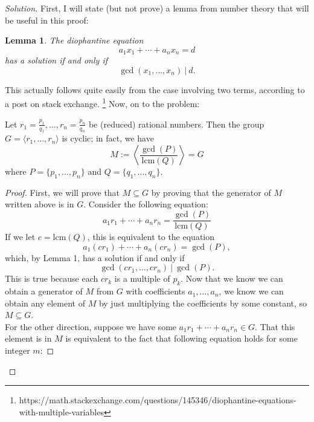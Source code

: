 \documentclass[12pt]{article}
\newenvironment{proposition}[1][Proposition]{\begin{trivlist}
\item[\hskip \labelsep {\bfseries #1.}]}{\end{trivlist}}
\newcommand{\lcm}[1]{\text{lcm}(#1)}
\newenvironment{solution}
  {\renewcommand\qedsymbol{$\blacksquare$}\begin{proof}[Solution]}
{\end{proof}}
\newenvironment{sproof}{
  \renewcommand\qedsymbol{$\square$}
  \begin{proof}
  }{
  \end{proof}
}
\newtheorem{lemma}{Lemma}
\begin{document}
\begin{solution}
  First, I will state (but not prove) a lemma from number theory
  that will be useful in this proof:
  \begin{lemma}
    The diophantine equation
    \begin{equation*}
      a_1x_1 + \cdots + a_nx_n = d
    \end{equation*}
    has a solution if and only if $$\gcd(x_1,\dots,x_n)~|~d.$$
  \end{lemma}
  This actually follows quite easily from the case involving two terms, according to a post on stack exchange.
  \footnote{https://math.stackexchange.com/questions/145346/diophantine-equations-with-multiple-variables}
  Now, on to the problem:
  \begin{proposition}
    Let $r_1=\frac{p_1}{q_1}, \dots, r_n=\frac{p_n}{q_n}$ be (reduced) rational numbers.
    Then the group $G=\langle r_1,\dots,r_n\rangle$ is cyclic; in fact, we have
    \begin{equation*}
      M := \left\langle \frac{\gcd(P)}{\lcm{Q}}\right\rangle = G
    \end{equation*}
    where $P=\{p_1,\dots,p_n\}$ and $Q=\{q_1,\dots,q_n\}$.
  \end{proposition}
  \begin{sproof}
    First, we will prove that $M \subseteq G$ by proving that the generator of $M$ written above is in $G$.
    Consider the following equation:
    \begin{equation*}
      a_1r_1 + \cdots + a_nr_n = \frac{\gcd(P)}{\lcm{Q}}
    \end{equation*}
    If we let $c=\lcm{Q}$, this is equivalent to the equation
    \begin{equation*}
      a_1(cr_1) + \cdots + a_n(cr_n) = \gcd(P),
    \end{equation*}
    which, by Lemma 1, has a solution if and only if 
    \begin{equation*}
      \gcd(cr_1, \dots, cr_n)~|~\gcd(P).
    \end{equation*}
    This is true because each $cr_k$ is a multiple of $p_k$.
    Now that we know we can obtain a generator of $M$ from $G$ with coefficients $a_1,\dots,a_n$,
    we know we can obtain any element of $M$ by just multiplying the coefficients by some constant,
    so $M \subseteq G$. \\
    For the other direction, suppose we have some $a_1r_1+\cdots+a_nr_n\in G$.
    That this element is in $M$ is equivalent to the fact that following equation holds for some integer $m$:

\end{sproof}
\end{solution}
\end{document}
